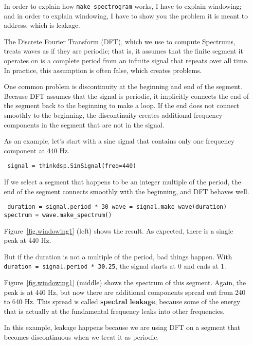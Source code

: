 \documentclass[12pt]{book} \usepackage[width=5.5in,height=8.5in, hmarginratio=3:2,vmarginratio=1:1]{geometry}
\begin{document}
In order to explain how \verb"make_spectrogram" works, I have to explain windowing; and in order to explain windowing, I have to show you the problem it is meant to address, which is leakage. 

The Discrete Fourier Transform (DFT), which we use to compute Spectrums, treats waves as if they are periodic; that is, it assumes that the finite segment it operates on is a complete period from an infinite signal that repeats over all time. In practice, this assumption is often false, which creates problems. 

One common problem is discontinuity at the beginning and end of the segment. Because DFT assumes that the signal is periodic, it implicitly connects the end of the segment back to the beginning to make a loop. If the end does not connect smoothly to the beginning, the discontinuity creates additional frequency components in the segment that are not in the signal. 

As an example, let's start with a sine signal that contains only one frequency component at 440 Hz. 

\begin{verbatim} signal = thinkdsp.SinSignal(freq=440) \end{verbatim} 

If we select a segment that happens to be an integer multiple of the period, the end of the segment connects smoothly with the beginning, and DFT behaves well. 

\begin{verbatim} duration = signal.period * 30 wave = signal.make_wave(duration) spectrum = wave.make_spectrum() \end{verbatim} 

Figure~\ref{fig.windowing1} (left) shows the result. As expected, there is a single peak at 440 Hz. 

But if the duration is not a multiple of the period, bad things happen. With {\tt duration = signal.period * 30.25}, the signal starts at 0 and ends at 1. 

Figure~\ref{fig.windowing1} (middle) shows the spectrum of this segment. Again, the peak is at 440 Hz, but now there are additional components spread out from 240 to 640 Hz. This spread is called {\bf spectral leakage}, because some of the energy that is actually at the fundamental frequency leaks into other frequencies. 

In this example, leakage happens because we are using DFT on a segment that becomes discontinuous when we treat it as periodic. 
\end{document}
